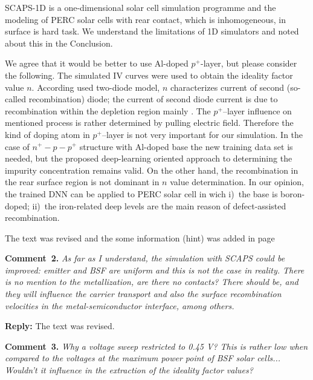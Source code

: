\documentclass[num-refs]{wiley-article} %
\begin{document}
SCAPS-1D is a one-dimensional solar cell simulation programme and
the modeling of PERC solar cells with rear contact, which is
inhomogeneous, in surface is hard task.
We understand the limitations of 1D simulators and noted about this in the Conclusion.

We agree that it would be better to use Al-doped $p^+$-layer, but please consider the following.
The simulated IV curves were used to obtain the ideality factor value $n$.
According used two-diode model,
$n$ characterizes current of second (so-called recombination)  diode;
the current of second diode current is due to recombination within
the depletion region mainly \citep{Breitenstein2013}.
The $p^+$--layer influence on mentioned process is rather determined by
pulling electric field.  
Therefore the kind of doping atom in $p^+$--layer is not very important for our simulation.
In the case of $n^+-p-p^+$ structure with Al-doped base the new training data set is needed,
but the proposed deep-learning oriented approach to determining the impurity concentration remains valid.
On the other hand, the recombination in the rear surface region is not dominant
in $n$ value determination.
In our opinion, the trained DNN can be applied to PERC solar cell in wich
i)~the base is boron-doped;
ii)~the iron-related deep levels are the main reason of defect-assisted recombination. 


The text was revised and the some information (hint) was added in page 


\vspace{1cm}
\noindent
\textcolor[rgb]{0.00,0.50,1.00}{\textbf{Comment~2.}}
\emph{As far as I understand, the simulation with SCAPS could be improved: emitter and BSF are uniform and this is not the case in reality.
There is no mention to the metallization, are there no contacts?
There should be, and they will influence the carrier transport and also the surface recombination velocities in the metal-semiconductor interface, among others.}

\vspace{0.5cm}
\noindent
\textcolor[rgb]{0.51,0.00,0.00}{\textbf{Reply:}}
The text was revised.

\vspace{1cm}
\noindent
\textcolor[rgb]{0.00,0.50,1.00}{\textbf{Comment~3.}}
\emph{Why a voltage sweep restricted to 0.45 V?
This is rather low when compared to the voltages at the maximum power point of BSF solar cells...
Wouldn't it influence in the extraction of the ideality factor values?}
\end{document}
